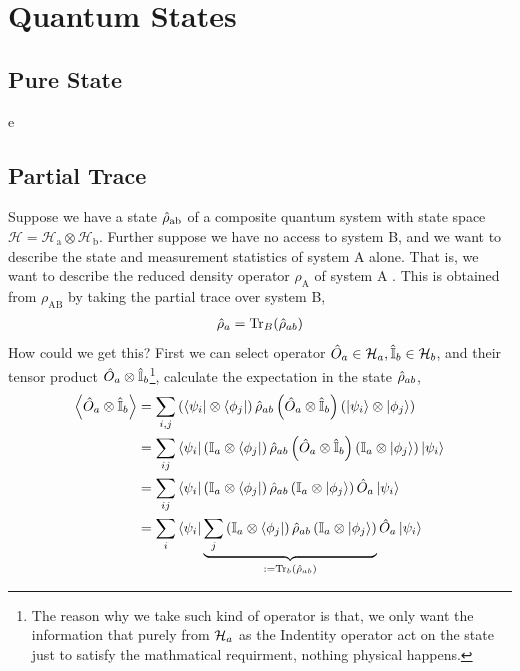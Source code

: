 \newpage

\section{Quantum States}

\subsection{Pure State}

e

\subsection{Partial Trace}
Suppose we have a state $\hat{\rho}_{\mathrm{ab}}$ of a composite quantum system with state space $\mathcal{H}=\mathcal{H}_{\mathrm{a}} \otimes \mathcal{H}_{\mathrm{b}}$. Further suppose we have no access to system B, and we want to describe the state and measurement statistics of system A alone. That is, we want to describe the reduced density operator $\rho_{\mathrm{A}}$ of system A . This is obtained from $\rho_{\mathrm{AB}}$ by taking the partial trace over system B, 
\begin{eqnarray}
    \hat{\rho}_a = \mathrm{Tr}_B(\hat{\rho}_{ab})
\end{eqnarray}
How could we get this? First we can select operator $\hat{O}_a \in \mathcal{H}_a, \hat{\mathbb{I}}_b \in \mathcal{H}_b$, and their tensor product $\hat{O}_a \otimes \hat{\mathbb{I}}_b$\footnote{The reason why we take such kind of operator is that, we only want the information that purely from $\mathcal{H}_a$ as the Indentity operator act on the state just to satisfy the mathmatical requirment, nothing physical happens.}, calculate the expectation in the state $\hat{\rho}_{ab}$,
\begin{align}
    \left\langle \hat{O}_a \otimes \hat{\mathbb{I}}_b \right\rangle &= \sum_{i,j}  \left(\bra{\psi_i} \otimes \bra{\phi_j}\right) \hat{\rho}_{ab} \left( \hat{O}_a \otimes \hat{\mathbb{I}}_b \right) \left( \ket{\psi_i} \otimes \ket{\phi_j}  \right) \notag \\ 
    &= \sum_{ij} \bra{\psi_i} \left(\mathbb{I}_a \otimes \bra{\phi_j}\right) \hat{\rho}_{ab} \left( \hat{O}_a \otimes \hat{\mathbb{I}}_b \right) \left(\mathbb{I}_a \otimes \ket{\phi_j}\right) \ket{\psi_i} \notag \\ 
    &= \sum_{ij} \bra{\psi_i} \left(\mathbb{I}_a \otimes \bra{\phi_j}\right) \hat{\rho}_{ab} \left(\mathbb{I}_a \otimes \ket{\phi_j}\right) \hat{O}_a \ket{\psi_i} \notag \\ 
    &= \sum_{i} \bra{\psi_i} \underbrace{ \sum_j\left(\mathbb{I}_a \otimes \bra{\phi_j}\right) \hat{\rho}_{ab} \left(\mathbb{I}_a \otimes \ket{\phi_j}\right)}_{:= \mathrm{Tr}_b \left(\hat{\rho}_{ab}\right)} \hat{O}_a \ket{\psi_i}
\end{align}
